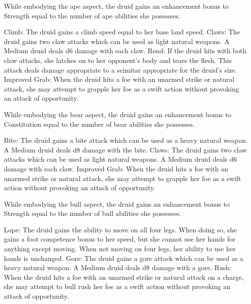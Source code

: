 While embodying the ape aspect, the druid gains an enhancement bonus to Strength equal to the number of ape abilities she possesses.
\begin{wildaspect}
\wilditem Climb: The druid gains a climb speed equal to her base land speed.
\wilditem Claws: The druid gains two claw attacks which can be used as light natural weapons. A Medium druid deals d6 damage with each claw.
\wilditem Rend: If the druid hits with both claw attacks, she latches on to her opponent's body and tears the flesh. This attack deals damage appropriate to a scimitar appropriate for the druid's size.
\wilditem Improved Grab: When the druid hits a foe with an unarmed strike or natural attack, she may attempt to grapple her foe as a swift action without provoking an attack of opportunity.
\end{wildaspect}

While embodying the bear aspect, the druid gains an enhancement bonus to Constitution equal to the number of bear abilities she possesses.
\begin{wildaspect}
\wilditem Bite: The druid gains a bite attack which can be used as a heavy natural weapon. A Medium druid deals d8 damage with the bite.
\wilditem Claws: The druid gains two claw attacks which can be used as light natural weapons. A Medium druid deals d6 damage with each claw.
\wilditem
\wilditem Improved Grab: When the druid hits a foe with an unarmed strike or natural attack, she may attempt to grapple her foe as a swift action without provoking an attack of opportunity.
\end{wildaspect}

While embodying the bull aspect, the druid gains an enhancement bonus to Strength equal to the number of bull abilities she possesses.
\begin{wildaspect}
\wilditem Lope: The druid gains the ability to move on all four legs. When doing so, she gains a  foot competence bonus to her speed, but she cannot use her hands for anything except moving. When not moving on four legs, her ability to use her hands is unchanged.
\wilditem Gore: The druid gains a gore attack which can be used as a heavy natural weapon. A Medium druid deals d8 damage with a gore.
\wilditem Rush: When the druid hits a foe with an unarmed strike or natural attack on a charge, she may attempt to bull rush her foe as a swift action without provoking an attack of opportunity.
\wilditem
\end{wildaspect}

